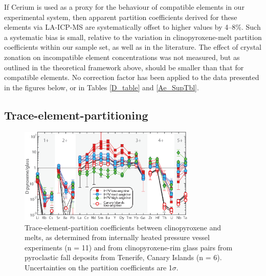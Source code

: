 \documentclass[review,authoryear,12pt]{elsarticle}
\begin{document}
If Cerium is used as a proxy for the behaviour of compatible elements in our experimental system, then apparent partition coefficients derived for these elements via LA-ICP-MS are systematically offset to higher values by 4--8\%. Such a systematic bias is small, relative to the variation in clinopyroxene-melt partition coefficients within our sample set, as well as in the literature. The effect of crystal zonation on incompatible element concentrations was not measured, but as outlined in the theoretical framework above, should be smaller than that for compatible elements. No correction factor has been applied to the data presented in the figures below, or in Tables \ref{D_table} and \ref{Ae_SupTbl}. 

\subsection{Trace-element-partitioning}


        \begin{figure}[tb]
        \begin{center}
        \includegraphics[width=0.75\textwidth]{6_Px_D_Spider_Apr2018.eps}
        \caption[Extended trace-element-partitioning diagram for clinopyroxene/melt]{Trace-element-partition coefficients between clinopyroxene and melts, as determined from internally heated pressure vessel experiments (n = 11) and from clinopyroxene-rim glass pairs from pyroclastic fall deposits from Tenerife, Canary Islands (n = 6). Uncertainties on the partition coefficients are 1$\sigma$.}
        \label{6_D_Spider}
        \end{center}
        \end{figure}
\end{document}
